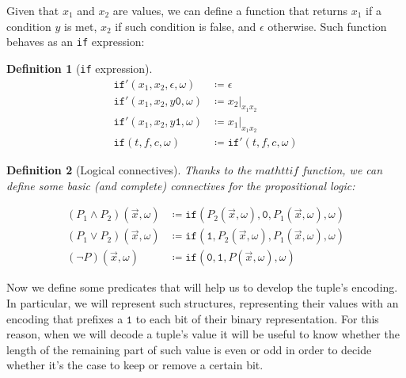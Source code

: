 \documentclass[10pt]{amsart}
\newcommand{\zero}{\mathtt{0}}
\newcommand{\one}{\mathtt{1}}
\newcommand{\vone}{x}
\newcommand{\vtwo}{y}
\newcommand{\oone}{\omega}
\newcommand{\If}{\mathtt{if}}
\newtheorem{defn}{Definition}
\begin{document}
Given that $\vone_1$ and $\vone_2$ are values, we can define a function that returns $\vone_1$ if a condition $\vtwo$ is met, $\vone_2$ if such condition is false, and $\epsilon$ otherwise. Such function behaves as an \texttt{if} expression:
\begin{defn} [\texttt{if} expression]

\begin{align*}
\If'(\vone_1, \vone_2, \epsilon, \oone)&\coloneqq \epsilon\\
\If'(\vone_1, \vone_2, \vtwo\zero, \oone)&\coloneqq \vone_2|_{\vone_1\vone_2}\\
\If'(\vone_1, \vone_2, \vtwo\one, \oone)&\coloneqq \vone_1|_{\vone_1\vone_2}\\
\If(t, f, c, \oone) &\coloneqq \If'(t, f, c, \oone)
\end{align*}

\end{defn}

\begin{defn}[Logical connectives]
Thanks to the $mathtt{if}$ function, we can define some basic (and complete) connectives for the propositional logic:

\begin{align*}
(P_1\land P_2)(\vec \vone, \oone) &\coloneqq \If(P_2(\vec \vone, \oone), \zero, P_1(\vec \vone, \oone), \oone)\\
(P_1\lor P_2)(\vec \vone, \oone) &\coloneqq \If(\one, P_2(\vec \vone, \oone), P_1(\vec \vone, \oone), \oone)\\
(\lnot P)(\vec \vone, \oone) &\coloneqq \If(\zero, \one, P(\vec \vone, \oone), \oone)
\end{align*}
\end{defn}

Now we define some predicates that will help us to develop the tuple's encoding. In particular, we will represent such structures, representing their values with an encoding that prefixes a $\one$ to each bit of their binary representation. For this reason, when we will decode a tuple's value it will be useful to know whether the length of the remaining part of such value is even or odd in order to decide whether it's the case to keep or remove a certain bit.
\end{document}
